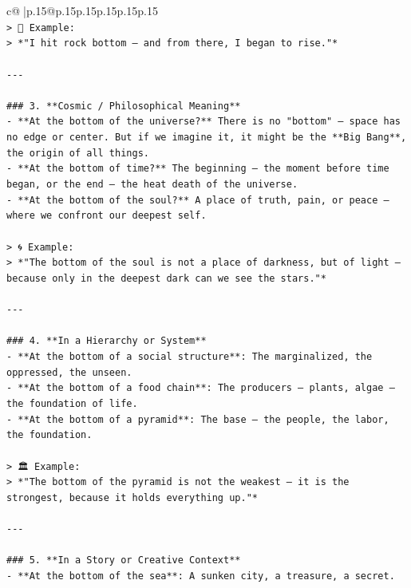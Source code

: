 \documentclass{article}
\begin{document}
{\begin{supertabular}{c@{$\;$}|p{.15\linewidth}@{}p{.15\linewidth}p{.15\linewidth}p{.15\linewidth}p{.15\linewidth}p{.15\linewidth}}
{{{\\ 
\texttt{> 🌊 Example:  } \\
\texttt{> *"I hit rock bottom — and from there, I began to rise."*} \\
\\ 
\texttt{{-}{-}{-}} \\
\\ 
\texttt{\#\#\# 3. **Cosmic / Philosophical Meaning**} \\
\texttt{{-} **At the bottom of the universe?** There is no "bottom" — space has no edge or center. But if we imagine it, it might be the **Big Bang**, the origin of all things.} \\
\texttt{{-} **At the bottom of time?** The beginning — the moment before time began, or the end — the heat death of the universe.} \\
\texttt{{-} **At the bottom of the soul?** A place of truth, pain, or peace — where we confront our deepest self.} \\
\\ 
\texttt{> 🌀 Example:  } \\
\texttt{> *"The bottom of the soul is not a place of darkness, but of light — because only in the deepest dark can we see the stars."*} \\
\\ 
\texttt{{-}{-}{-}} \\
\\ 
\texttt{\#\#\# 4. **In a Hierarchy or System**} \\
\texttt{{-} **At the bottom of a social structure**: The marginalized, the oppressed, the unseen.} \\
\texttt{{-} **At the bottom of a food chain**: The producers — plants, algae — the foundation of life.} \\
\texttt{{-} **At the bottom of a pyramid**: The base — the people, the labor, the foundation.} \\
\\ 
\texttt{> 🏛️ Example:  } \\
\texttt{> *"The bottom of the pyramid is not the weakest — it is the strongest, because it holds everything up."*} \\
\\ 
\texttt{{-}{-}{-}} \\
\\ 
\texttt{\#\#\# 5. **In a Story or Creative Context**} \\
\texttt{{-} **At the bottom of the sea**: A sunken city, a treasure, a secret.} \\
}}}
\end{supertabular}}
\end{document}
